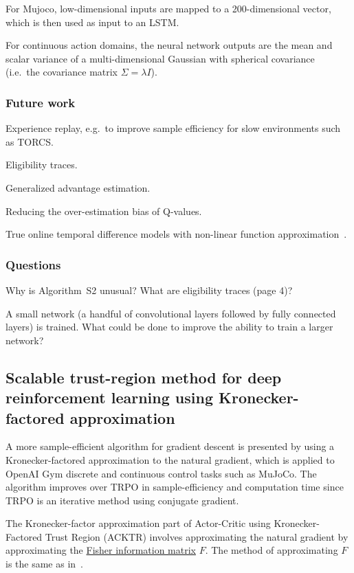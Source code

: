 \documentclass[a4paper, 12pt]{article}
\begin{document}
For Mujoco, low-dimensional inputs are mapped to a 200-dimensional vector,
which is then used as input to an LSTM\@.

For continuous action domains, the neural network outputs are the mean and
scalar variance of a multi-dimensional Gaussian with spherical covariance
(i.e.\ the covariance matrix $\Sigma = \lambda I$).

\subsubsection{Future work}

Experience replay, e.g.\ to improve sample efficiency for slow environments
such as TORCS\@.

Eligibility traces.

Generalized advantage estimation.

Reducing the over-estimation bias of Q-values.

True online temporal difference models with non-linear function
approximation~\citet{DBLP:journals/corr/SeijenMPMS15}.

\subsubsection{Questions}

Why is Algorithm~S2 unusual? What are eligibility traces (page 4)?

A small network (a handful of convolutional layers followed by fully connected
layers) is trained. What could be done to improve the ability to train a larger
network?


\subsection{Scalable trust-region method for deep reinforcement learning using
            Kronecker-factored
            approximation~\citet{DBLP:journals/corr/abs-1708-05144}}

A more sample-efficient algorithm for gradient descent is presented by using a
Kronecker-factored approximation to the natural gradient, which is applied to
OpenAI Gym discrete and continuous control tasks such as MuJoCo. The algorithm
improves over TRPO in sample-efficiency and computation time since TRPO is an
iterative method using conjugate gradient.

The Kronecker-factor approximation part of Actor-Critic using
Kronecker-Factored Trust Region (ACKTR) involves approximating the natural
gradient by approximating the
\hyperref[fisher-info]{Fisher information matrix} $F$. The method of
approximating $F$ is the same as in~\citet{DBLP:journals/corr/MartensG15}.
\end{document}
